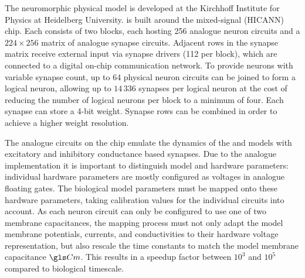 The neuromorphic physical model \NMPM is developed at the Kirchhoff Institute for Physics at Heidelberg University. \NMPM is built around the mixed-signal \HICANN (\acrlong{HICANN}) chip. Each \HICANN consists of two blocks, each hosting 256 analogue neuron circuits and a $224\times256$ matrix of analogue synapse circuits. Adjacent rows in the synapse matrix receive external input via synapse drivers (112 per block), which are connected to a digital on-chip communication network. To provide neurons with variable synapse count, up to 64 physical neuron circuits can be joined to form a logical neuron, allowing up to $14\,336$ synapses per logical neuron at the cost of reducing the number of logical neurons per block to a minimum of four. Each synapse can store a 4-bit weight. Synapse rows can be combined in order to achieve a higher weight resolution.

The analogue circuits on the chip emulate the dynamics of the \AdEx and \LIF models with excitatory and inhibitory conductance based synapses. Due to the analogue implementation it is important to distinguish model and hardware parameters: individual hardware parameters are mostly configured as voltages in analogue floating gates. The biological model parameters must be mapped onto these hardware parameters, taking calibration values for the individual circuits into account.
As each neuron circuit can only be configured to use one of two membrane capacitances, the mapping process must not only adapt the model membrane potentials, currents, and conductivities to their hardware voltage representation, but also rescale the time constants to match the model membrane capacitance $\Cm$. This results in a speedup factor between $10^3$ and $10^5$ compared to biological timescale.

